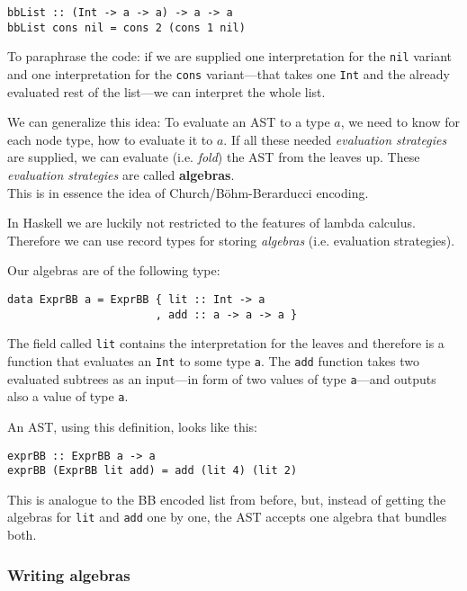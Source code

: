 \begin{lstlisting}
bbList :: (Int -> a -> a) -> a -> a
bbList cons nil = cons 2 (cons 1 nil)
\end{lstlisting}

To paraphrase the code: if we are supplied one interpretation for the
\texttt{nil} variant and one interpretation for the \texttt{cons} variant—that
takes one \texttt{Int} and the already evaluated rest of the list—we can
interpret the whole list.

We can generalize this idea: To evaluate an AST to a type $a$, we need to know
for each node type, how to evaluate it to $a$. If all these needed
\emph{evaluation strategies} are supplied, we can evaluate (i.e. \emph{fold})
the AST from the leaves up. These \emph{evaluation strategies} are called
\textbf{algebras}.\\
This is in essence the idea of Church/Böhm-Berarducci encoding.

In Haskell we are luckily not restricted to the features of lambda calculus.
Therefore we can use record types for storing \emph{algebras} (i.e. evaluation
strategies).

Our algebras are of the following type:

\begin{lstlisting}
data ExprBB a = ExprBB { lit :: Int -> a
                       , add :: a -> a -> a }
\end{lstlisting}

The field called \texttt{lit} contains the interpretation for the leaves and
therefore is a function that evaluates an \texttt{Int} to some type \texttt{a}.
The \texttt{add} function takes two evaluated subtrees as an input—in form of
two values of type \texttt{a}—and outputs also a value of type \texttt{a}.

An AST, using this definition, looks like this:

\begin{lstlisting}
exprBB :: ExprBB a -> a
exprBB (ExprBB lit add) = add (lit 4) (lit 2)
\end{lstlisting}

This is analogue to the BB encoded list from before, but, instead of getting
the algebras for \texttt{lit} and \texttt{add} one by one, the AST accepts one
algebra that bundles both.

\subsubsection{Writing algebras}

